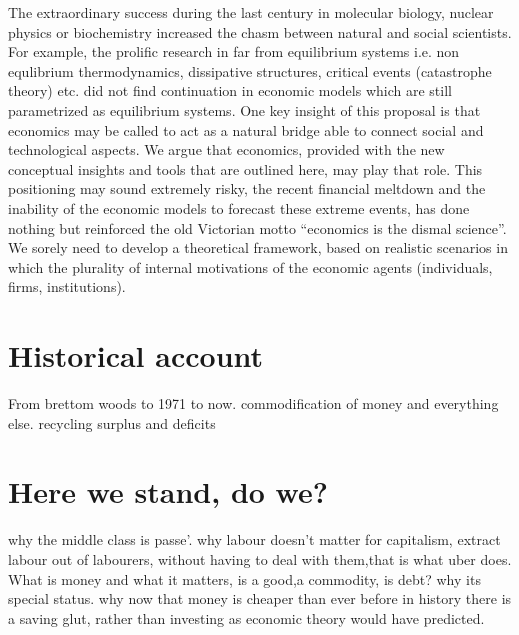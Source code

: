 \documentclass[11pt, onecolumn]{article}
\begin{document}
The extraordinary success during the last century in molecular biology, nuclear physics or biochemistry increased the chasm between natural and social scientists. For example, the prolific research in far from equilibrium systems i.e. non equlibrium thermodynamics, dissipative structures, critical events (catastrophe theory) etc. did not find continuation in economic models which are still parametrized as equilibrium systems.
One key insight of this proposal is that economics may be called to act as a natural bridge able to connect social and technological aspects. We argue that economics, provided with the new conceptual insights and tools that are outlined here, may play that role. This positioning may sound extremely risky, the recent financial meltdown and the inability of the economic models to forecast these extreme events, has done nothing but reinforced the old Victorian motto “economics is the dismal science”. We sorely need to develop a theoretical framework, based on realistic scenarios in which the plurality of internal motivations of the economic agents (individuals, firms, institutions). 
 
\section{Historical account}
\label{se:hisacc}
From brettom woods to 1971 to now. 
commodification of money and everything else.
recycling surplus and deficits

\section{Here we stand, do we?}
\label{se:hisacc}
why the middle class is passe'.
why labour doesn't matter for capitalism, extract labour out of labourers, without having to deal with them,that is what uber does.
What is money and what it matters, is a good,a commodity, is debt? why its special status.
why now that money is cheaper than ever before in history there is a saving glut, rather than investing as economic theory would have predicted.
\end{document}
